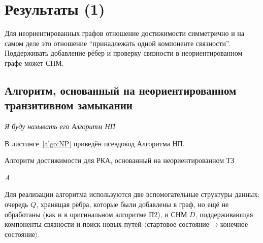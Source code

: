 \section{Результаты (1)}

Для неориентированных графов отношение достижимости симметрично и на самом деле это отношение ``принадлежать одной компоненте связности''. Поддерживать добавление рёбер и проверку связности в неориентированном графе может СНМ. 

\subsection{Алгоритм, основанный на неориентированном транзитивном замыкании}

\textit{Я буду называть его Алгоритм НП}

В листинге~\ref{algo:NP} приведён псевдокод Алгоритма НП.

\begin{algorithm}[H]
    \begin{algorithmic}[1]
    \caption{Алгоритм достижимости для РКА, основанный на неориентированном ТЗ}
    \label{algo:NP}
            \EndFor
        \EndFor
            \EndIf
        \EndWhile
    \State \Return $A$
    \EndFunction
    \end{algorithmic}
\end{algorithm}

Для реализации алгоритма используются две вспомогательные структуры данных: очередь $Q$, хранящая рёбра, которые были добавлены в граф, но ещё не обработаны (как и в оригинальном алгоритме П2), и СНМ $D$, поддерживающая компоненты связности и поиск новых путей $\langle$стартовое состояние$\to$конечное состояние$\rangle$. 

